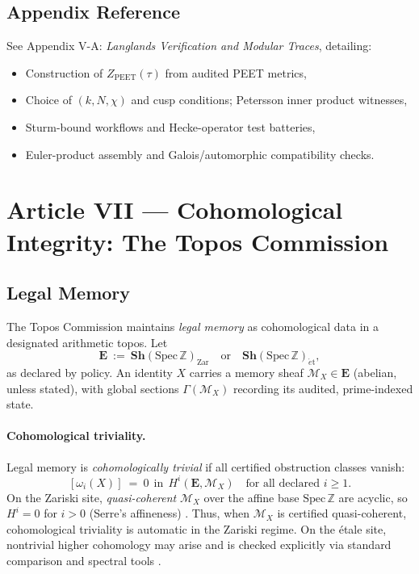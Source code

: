 \documentclass[12pt]{amsart}
\theoremstyle{plain}
\begin{document}
\subsection*{Appendix Reference}

See Appendix V-A: \emph{Langlands Verification and Modular Traces}, detailing:
\begin{itemize}
  \item Construction of $Z_{\mathrm{PEET}}(\tau)$ from audited PEET metrics,
  \item Choice of $(k,N,\chi)$ and cusp conditions; Petersson inner product witnesses,
  \item Sturm-bound workflows and Hecke-operator test batteries,
  \item Euler-product assembly and Galois/automorphic compatibility checks.
\end{itemize}

\section{Article VII — Cohomological Integrity: The Topos Commission}

\subsection{Legal Memory}

The Topos Commission maintains \emph{legal memory} as cohomological data in a designated arithmetic topos. Let
\[
\mathbf{E}\ :=\ \mathbf{Sh}(\mathrm{Spec}\,\mathbb{Z})_{\mathrm{Zar}}
\quad\text{or}\quad
\mathbf{Sh}(\mathrm{Spec}\,\mathbb{Z})_{\acute{e}\mathrm{t}},
\]
as declared by policy. An identity $X$ carries a memory sheaf $\mathscr{M}_X\in\mathbf{E}$ (abelian, unless stated), with global sections $\Gamma(\mathscr{M}_X)$ recording its audited, prime-indexed state.

\paragraph{Cohomological triviality.}
Legal memory is \emph{cohomologically trivial} if all certified obstruction classes vanish:
\[
[\omega_i(X)]\ =\ 0\ \ \text{in}\ \ H^i(\mathbf{E},\mathscr{M}_X)\quad\text{for all declared }i\ge 1.
\]
On the Zariski site, \emph{quasi-coherent} $\mathscr{M}_X$ over the affine base $\mathrm{Spec}\,\mathbb{Z}$ are acyclic, so $H^i=0$ for $i>0$ (Serre’s affineness) \cite[III.3.5]{hartshorne1977algebraic}. Thus, when $\mathscr{M}_X$ is certified quasi-coherent, cohomological triviality is automatic in the Zariski regime. On the étale site, nontrivial higher cohomology may arise and is checked explicitly via standard comparison and spectral tools \cite{milne1980etale,SGA4}.
\end{document}
